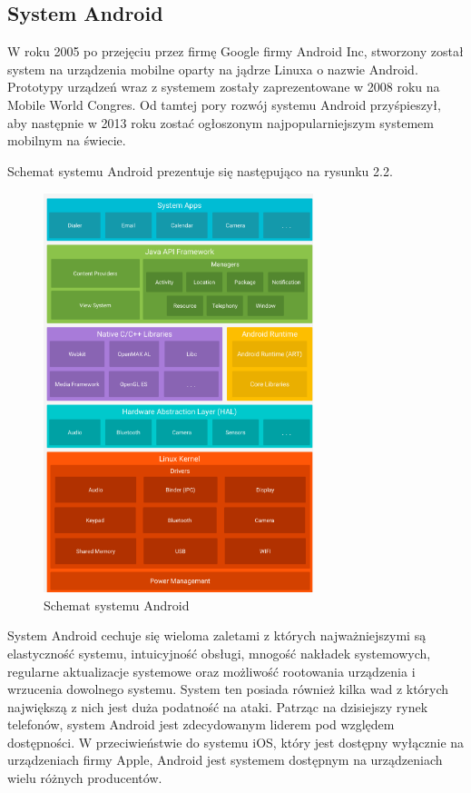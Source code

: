\documentclass[a4paper,12pt,oneside]{book}
\begin{document}
	\subsection{System Android}
	W roku 2005 po przejęciu przez firmę Google firmy Android Inc, stworzony został system na urządzenia mobilne oparty na jądrze Linuxa o nazwie Android. Prototypy urządzeń wraz z systemem zostały zaprezentowane w 2008 roku na Mobile World Congres. Od tamtej pory rozwój systemu Android przyśpieszył, aby następnie w 2013 roku zostać ogłoszonym najpopularniejszym systemem mobilnym na świecie.
	
	\newpage
	Schemat systemu Android prezentuje się następująco na rysunku 2.2.
	
	\begin{figure}[h]
		\centering
		\includegraphics[width=0.70\textwidth]{grafika/schemat_android.png}
		\caption{Schemat systemu Android}
	\end{figure}
	
	System Android cechuje się wieloma zaletami z których najważniejszymi są elastyczność systemu, intuicyjność obsługi, mnogość nakładek systemowych, regularne aktualizacje systemowe oraz możliwość rootowania urządzenia i wrzucenia dowolnego systemu. System ten posiada również kilka wad z których największą z nich jest duża podatność na ataki. Patrząc na dzisiejszy rynek telefonów, system Android jest zdecydowanym liderem pod względem dostępności. W przeciwieństwie do systemu iOS, który jest dostępny wyłącznie na urządzeniach firmy Apple, Android jest systemem dostępnym na urządzeniach wielu różnych producentów.
	
\end{document}
